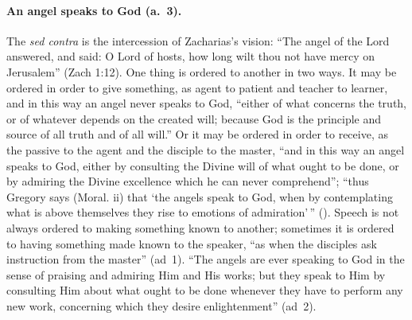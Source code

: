 \paragraph{An angel speaks to God (a.~3).} The \emph{sed contra} is the
intercession of Zacharias's vision: ``The angel of the Lord answered, and
said: O Lord of hosts, how long wilt thou not have mercy on Jerusalem'' (Zach
1:12). One thing is ordered to another in two ways. It may be ordered in
order to give something, as agent to patient and teacher to learner, and in
this way an angel never speaks to God, ``either of what concerns the truth,
or of whatever depends on the created will; because God is the principle and
source of all truth and of all will.'' Or it may be ordered in order to
receive, as the passive to the agent and the disciple to the master, ``and in
this way an angel speaks to God, either by consulting the Divine will of what
ought to be done, or by admiring the Divine excellence which he can never
comprehend''; ``thus Gregory says (Moral. ii) that `the angels speak to God,
when by contemplating what is above themselves they rise to emotions of
admiration'\,'' (). Speech is not always ordered to
making something known to another; sometimes it is ordered to having
something made known to the speaker, ``as when the disciples ask instruction
from the master'' (ad~1). ``The angels are ever speaking to God in the sense
of praising and admiring Him and His works; but they speak to Him by
consulting Him about what ought to be done whenever they have to perform any
new work, concerning which they desire enlightenment'' (ad~2).

